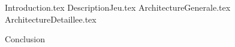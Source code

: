 \documentclass[a4paper,twoside, openany,11pt]{book}
\begin{document}
{Introduction.tex}
\newpage 
\pagestyle{PageNormale}
{DescriptionJeu.tex}
\newpage
{ArchitectureGenerale.tex}
\newpage
{ArchitectureDetaillee.tex}
\newpage
\pagestyle{empty}

{Conclusion}
\end{document}

